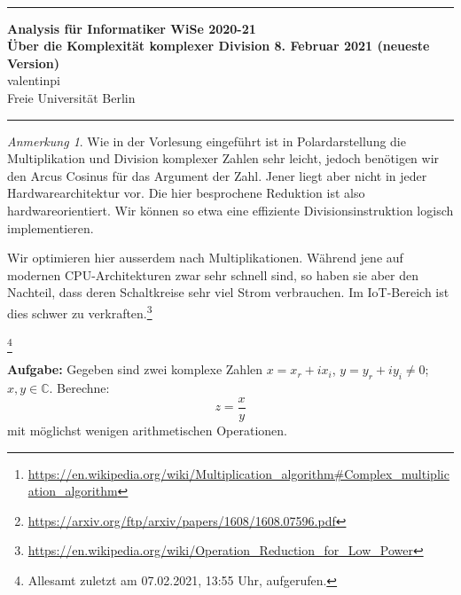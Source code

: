 \documentclass[10pt,fleqn]{article}
\theoremstyle{definition}
\theoremstyle{remark}
\newtheorem*{remark}{Anmerkung}
\newcommand{\Authors}{valentinpi}
\begin{document}
\vspace*{-12ex}
\phantom{}\\
\noindent\rule{\textwidth}{0.1pt}
\large \textbf{Analysis für Informatiker \hfill WiSe 2020-21} \vspace*{0.25cm}\\
\normalsize \textbf{Über die Komplexität komplexer Division \hfill 8. Februar 2021 { (neueste Version)}}\\
\Authors\\
Freie Universität Berlin\\
\noindent\rule{\textwidth}{0.1pt}

\begin{abstract}
    \noindent Diese Ausarbeitung zeigt die Division komplexer Zahlen in algebraischer Darstellung mithilfe linearer Gleichungssysteme und zeigt eine Reduktion der Komplexität des Algorithmus. Diese ist analog zu der Reduktion der Komplexität komplexer Multiplikation, welche bereits Gauß entdeckt hatte.\footnote{\url{https://en.wikipedia.org/wiki/Multiplication_algorithm\#Complex_multiplication_algorithm}} Die Reduktion selbst wurde von Aleksandr Cariow entdeckt. Hier soll dieses sehr kurze Paper erklärt werden.\footnote{\url{https://arxiv.org/ftp/arxiv/papers/1608/1608.07596.pdf}}
\end{abstract}

\begin{remark}
    Wie in der Vorlesung eingeführt ist in Polardarstellung die Multiplikation und Division komplexer Zahlen sehr leicht, jedoch benötigen wir den Arcus Cosinus für das Argument der Zahl. Jener liegt aber nicht in jeder Hardwarearchitektur vor. Die hier besprochene Reduktion ist also hardwareorientiert. Wir können so etwa eine effiziente Divisionsinstruktion logisch implementieren.

    Wir optimieren hier ausserdem nach Multiplikationen. Während jene auf modernen CPU-Architekturen zwar sehr schnell sind, so haben sie aber den Nachteil, dass deren Schaltkreise sehr viel Strom verbrauchen. Im IoT-Bereich ist dies schwer zu verkraften.\footnote{\url{https://en.wikipedia.org/wiki/Operation_Reduction_for_Low_Power}}
\end{remark}

{
    \let\thefootnote\relax\footnote{Allesamt zuletzt am 07.02.2021, 13:55 Uhr, aufgerufen.}
}

\textbf{Aufgabe:} Gegeben sind zwei komplexe Zahlen \(x = x_r + ix_i\), \(y = y_r + iy_i \neq 0\); \(x, y \in \mathbb{C}\). Berechne:
\[
    z = \frac{x}{y}
\]
mit möglichst wenigen arithmetischen Operationen.
\end{document}
